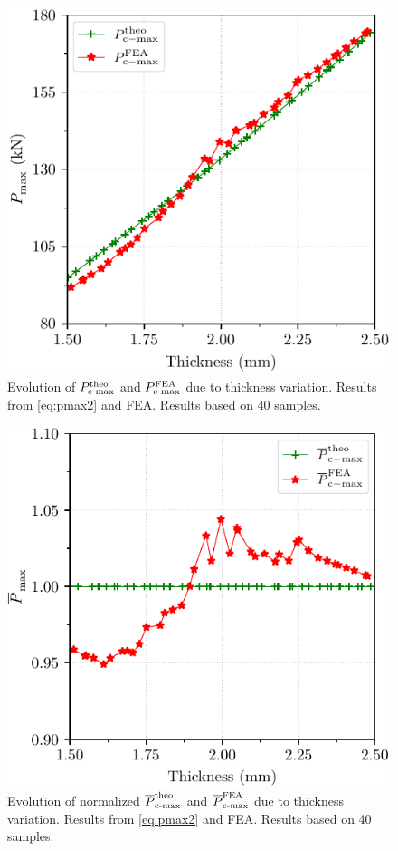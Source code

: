 \documentclass[12pt,number,preprint,review,times]{elsarticle}
\begin{document}
\begin{figure}[htpb]  
  \centering
   \includegraphics[width=.9\columnwidth]{./Pmax_evolution.pdf}
  \caption{Evolution of $P^{\mathrm{theo}}_{\mathrm{c{\text -}max}}$ and $P^{\mathrm{FEA}}_{\mathrm{c{\text -}max}}$ due to thickness variation. Results from \cref{eq:pmax2} and FEA. Results based on 40 samples.}
  \label{fig:Pmax_evolution2}
\end{figure}

\begin{figure}[htpb]
  \centering
   \includegraphics[width=.9\columnwidth]{./Pmax_evolution_normalized.pdf}
  \caption{Evolution of normalized $\overline{P}^{\mathrm{theo}}_{\mathrm{c{\text -}max}}$ and $\overline{P}^{\mathrm{FEA}}_{\mathrm{c{\text -}max}}$ due to thickness variation. Results from \cref{eq:pmax2} and FEA. Results based on 40 samples.}
  \label{fig:Pmax_evolution_normalized}
\end{figure}
\end{document}
